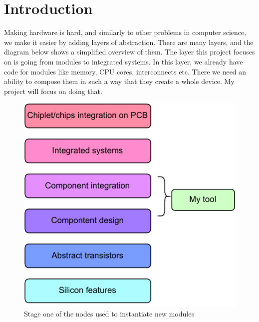\documentclass[12pt]{report}
\begin{document}
\chapter{Introduction}
Making hardware is hard, and similarly to other problems in computer science, we make it easier by adding layers of abstraction. There are many layers, and the diagram below shows a simplified overview of them. The layer this project focuses on is going from modules to integrated systems. In this layer, we already have code for modules like memory, CPU cores, interconnects etc. There we need an ability to compose them in such a way that they create a whole device. My project will focus on doing that.
\begin{figure}[h!]
    \centering
    \includegraphics[width=0.5\columnwidth]{pdfExports/LargeMapLayersOfAbstraction.pdf}
    \caption{Stage one of the nodes used to instantiate new modules}
\end{figure}
%     
\end{document}
